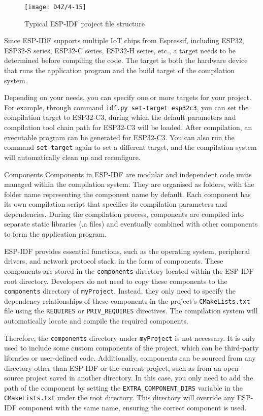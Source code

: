 \documentclass[a4paper,12pt]{book}
\begin{document}
\begin{figure}[h!]
    \centering
    \texttt{[image: D4Z/4-15]}
    \caption{Typical ESP-IDF project file structure}
    \label{Typical ESP-IDF project file structure}
\end{figure}

Since ESP-IDF supports multiple IoT chips from Espressif, including ESP32, ESP32-S series, ESP32-C series, ESP32-H series, etc., a target needs to be determined before compiling the code. The target is both the hardware device that runs the application program and the build target of the compilation system.

Depending on your needs, you can specify one or more targets for your project. For example, through command \verb|idf.py set-target esp32c3|, you can set the compilation target to ESP32-C3, during which the default parameters and compilation tool chain path for ESP32-C3 will be loaded. After compilation, an executable program can be generated for ESP32-C3. You can also run the command \verb|set-target| again to set a different target, and the compilation system will automatically clean up and reconfigure.

\begin{term}{Components}
    Components in ESP-IDF are modular and independent code units managed within the compilation system. They are organised as folders, with the folder name representing the component name by default. Each component has its own compilation script that specifies its compilation parameters and dependencies. During the compilation process, components are compiled into separate static libraries (.a files) and eventually combined with other components to form the application program.

    \parskip 6pt
    ESP-IDF provides essential functions, such as the operating system, peripheral drivers, and network protocol stack, in the form of components. These components are stored in the \verb|components| directory located within the ESP-IDF root directory. Developers do not need to copy these components to the \verb|components| directory of \verb|myProject|. Instead, they only need to specify the dependency relationships of these components in the project’s \verb|CMakeLists.txt| file using the \verb|REQUIRES| or \verb|PRIV_REQUIRES| directives. The compilation system will automatically locate and compile the required components.

    Therefore, the \verb|components| directory under \verb|myProject| is not necessary. It is only used to include some custom components of the project, which can be third-party libraries or user-defined code. Additionally, components can be sourced from any directory other than ESP-IDF or the current project, such as from an open-source project saved in another directory. In this case, you only need to add the path of the component by setting the \verb|EXTRA_COMPONENT_DIRS| variable in the \verb|CMakeLists.txt| under the root directory. This directory will override any ESP-IDF component with the same name, ensuring the correct component is used.
\end{term}
\end{document}
